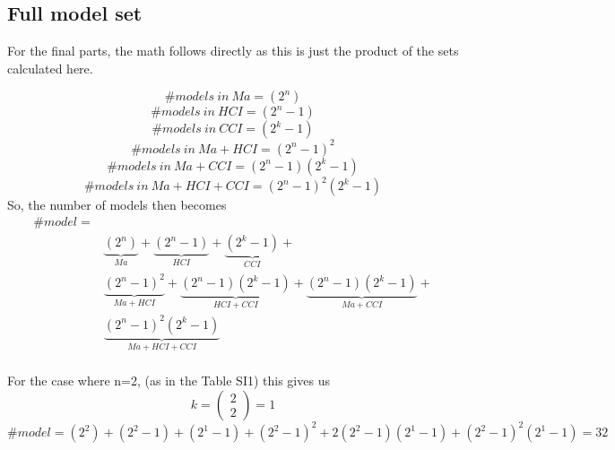 \subsection{Full model set}
For the final parts, the math follows directly as this is just the product of the sets calculated here. 

\[\#models\ in\ Ma=\left(2^n\right)\] 
\[\#models\ in\ HCI=\left(2^n-1\right)\] 
\[\#models\ in\ CCI=\left(2^k-1\right)\] 
\[\#models\ in\ Ma+HCI={\left(2^n-1\right)}^2\] 
\[\#models\ in\ Ma+CCI=\left(2^n-1\right)\left(2^k-1\right)\] 
\[\#models\ in\ Ma+HCI+CCI={\left(2^n-1\right)}^2\left(2^k-1\right)\] 
So, the number of models then becomes
\begin{equation*}
\begin{aligned}
\#model=\\
& \underbrace{\left(2^n\right)}_{Ma}+\underbrace{\left(2^n-1\right)}_{HCI}+\underbrace{\left(2^k-1\right)}_{CCI}+\\
&\underbrace{{\left(2^n-1\right)}^2}_{Ma+HCI}+\underbrace{\left(2^n-1\right)\left(2^k-1\right)}_{HCI+CCI}+\underbrace{\left(2^n-1\right)\left(2^k-1\right)}_{Ma+CCI}+\\
&\underbrace{{\left(2^n-1\right)}^2\left(2^k-1\right)}_{Ma+HCI+CCI} 
\end{aligned}
\end{equation*} \\

For the case where n=2, (as in the Table SI1) this gives us
\[k=\left( \begin{array}{c}
2 \\ 
2 \end{array}
\right)=1\] 
\[\#model=\left(2^2\right)+\left(2^2-1\right)+\left(2^1-1\right)+{\left(2^2-1\right)}^2+2\left(2^2-1\right)\left(2^1-1\right)+{\left(2^2-1\right)}^2\left(2^1-1\right)=32\] 
\eject 



